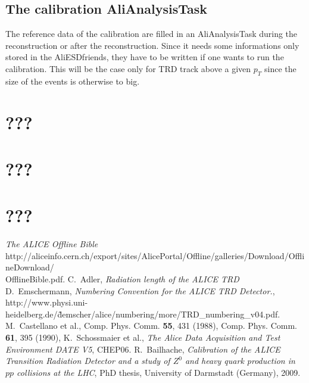 \documentclass{alicetdr}
\begin{document}
\subsection{The calibration AliAnalysisTask}
The reference data of the calibration are filled in an AliAnalysisTask 
during the reconstruction or after the reconstruction. Since it needs 
some informations only stored in the AliESDfriends, they have to be 
written if one wants to run the calibration. This will be the case 
only for TRD track above a given $p_{T}$ since the size of the events 
is otherwise to big.
%
\newpage
\setcounter{chapter}{4}
\setcounter{section}{0}    
\thispagestyle{empty}
%
\section{???}
%
\newpage
\setcounter{chapter}{5}
\setcounter{section}{0}    
\thispagestyle{empty}
%
\section{???}
%
\newpage
\setcounter{chapter}{6}
\setcounter{section}{0}    
\thispagestyle{empty}
%
\section{???}
%
\newpage
\setcounter{chapter}{7}
\setcounter{section}{0}    
\thispagestyle{empty}
%
\begin{thebibliography}{99}
%
  {\it The ALICE Offline Bible}\\
                   http://aliceinfo.cern.ch/export/sites/AlicePortal/Offline/galleries/Download/OfflineDownload/ \\
                   OfflineBible.pdf.
%
  C.~Adler,
                   {\it Radiation length of the ALICE TRD}
%
    D.~Emschermann,
                   {\it Numbering Convention for the ALICE TRD Detector.},
                   http://www.physi.uni-heidelberg.de/\~demscher/alice/numbering/more/TRD\_numbering\_v04.pdf.
%
   M.~Castellano et al.,
                   Comp. Phys. Comm. {\bf 55}, 431 (1988),
                   Comp. Phys. Comm. {\bf 61}, 395 (1990),
%
     K.~Schossmaier et al.,
                   {\it The Alice Data Acquisition and Test Environment DATE V5}, 
                   CHEP06.
%
  R.~Bailhache, 
                   {\it Calibration of the ALICE Transition Radiation Detector 
                   and a study of $Z^{0}$ and heavy quark production in $pp$ 
                   collisions at the LHC},
                   PhD thesis, University of Darmstadt (Germany), 2009.
%
\end{thebibliography}
%
%
\end{document}
